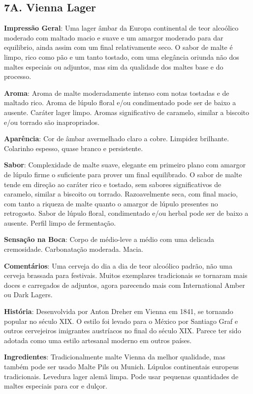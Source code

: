 \subsection*{7A. Vienna Lager}
\textbf{Impressão Geral}: Uma lager âmbar da Europa continental de teor alcoólico moderado com maltado macio e suave e um amargor moderado para dar equilibrio, ainda assim com um final relativamente seco. O sabor de malte é limpo, rico como pão e um tanto tostado, com uma elegância oriunda não dos maltes especiais ou adjuntos, mas sim da qualidade dos maltes base e do processo.

\textbf{Aroma}: Aroma de malte moderadamente intenso com notas tostadas e de maltado rico. Aroma de lúpulo floral e/ou condimentado  pode ser de baixo a ausente. Caráter lager limpo. Aromas significativo de caramelo, similar a biscoito e/ou torrado são inapropriados.

\textbf{Aparência}: Cor de âmbar avermelhado claro a cobre. Limpidez brilhante. Colarinho espesso, quase branco e persistente.

\textbf{Sabor}: Complexidade de malte suave, elegante em primeiro plano com amargor de lúpulo firme o suficiente para prover um final equilibrado. O sabor de malte tende em direção ao caráter rico e tostado, sem sabores significativos de caramelo, similar a biscoito ou torrado. Razoavelmente seca, com final macio, com tanto a riqueza de malte quanto o amargor de lúpulo presentes no retrogosto. Sabor de lúpulo floral, condimentado e/ou herbal pode ser de baixo a ausente. Perfil limpo de fermentação.

\textbf{Sensação na Boca}: Corpo de médio-leve a médio com uma delicada cremosidade. Carbonatação moderada. Macia.

\textbf{Comentários}: Uma cerveja do dia a dia de teor alcoólico padrão, não uma cerveja brassada para festivais. Muitos exemplares tradicionais se tornaram mais doces e carregados de adjuntos, agora parecendo mais com International Amber ou Dark Lagers.

\textbf{História}: Desenvolvida por Anton Dreher em Vienna em 1841, se tornando popular no século XIX. O estilo foi levado para o México por Santiago Graf e outros cervejeiros imigrantes austríacos no final do século XIX. Parece ter sido adotada como uma estilo artesanal moderno em outros países.

\textbf{Ingredientes}: Tradicionalmente malte Vienna da melhor qualidade, mas também pode ser usado Malte Pils ou Munich. Lúpulos continentais europeus tradicionais. Levedura lager alemã limpa. Pode usar pequenas quantidades de maltes especiais para cor e dulçor.

